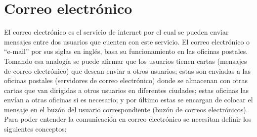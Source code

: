 \documentclass[12pt,oneside,onecolumn,openany]{report}
\begin{document}
\section{Correo electrónico} 
El  correo  electrónico  es  el  servicio  de  internet  por  el cual  se  pueden  enviar  mensajes entre dos usuarios que cuenten con este servicio. El correo electrónico o “e-mail”
 por sus siglas en inglés, basa su funcionamiento en las oficinas postales. Tomando esa analogía se puede afirmar  que  los  usuarios  tienen  cartas  (mensajes  de  correo  electrónico)  que desean  enviar  a  otros  usuarios;  estas  son  enviadas  a 
las  oficinas  postales (servidores de correo electrónico) donde se almacenan con otras cartas que van dirigidas a otros usuarios en diferentes ciudades; estas oficinas las envían a otras 
oficinas   si es  necesario;  y por  último estas se  encargan de colocar el mensaje en el  buzón del usuario correspondiente (buzón  de  correos  electrónicos).\\
Para poder entender la comunicación en correo electrónico se necesitan definir los siguientes conceptos:
\end{document}

